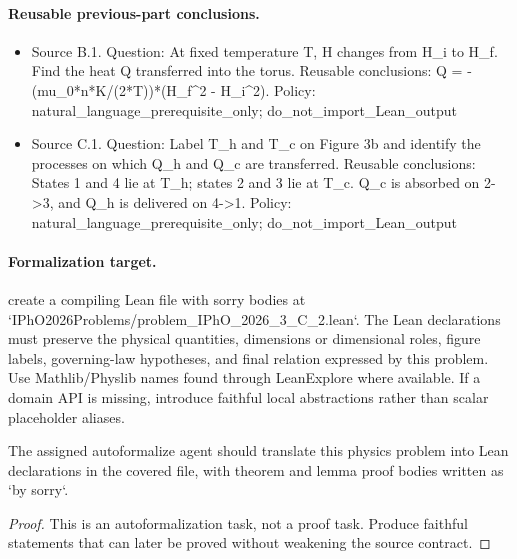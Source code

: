\paragraph{Reusable previous-part conclusions.}
\begin{itemize}
\item Source B.1. Question: At fixed temperature T, H changes from H\_i to H\_f. Find the heat Q transferred into the torus. Reusable conclusions: Q = -(mu\_0*n*K/(2*T))*(H\_f\textasciicircum{}2 - H\_i\textasciicircum{}2). Policy: natural\_language\_prerequisite\_only; do\_not\_import\_Lean\_output
\item Source C.1. Question: Label T\_h and T\_c on Figure 3b and identify the processes on which Q\_h and Q\_c are transferred. Reusable conclusions: States 1 and 4 lie at T\_h; states 2 and 3 lie at T\_c. Q\_c is absorbed on 2->3, and Q\_h is delivered on 4->1. Policy: natural\_language\_prerequisite\_only; do\_not\_import\_Lean\_output
\end{itemize}

\paragraph{Formalization target.}
create a compiling Lean file with sorry bodies at `IPhO2026Problems/problem\_IPhO\_2026\_3\_C\_2.lean`.
The Lean declarations must preserve the physical quantities, dimensions or dimensional roles, figure labels, governing-law hypotheses, and final relation expressed by this problem.
Use Mathlib/Physlib names found through LeanExplore where available. If a domain API is missing, introduce faithful local abstractions rather than scalar placeholder aliases.

\begin{theorem}
\label{thm:physics:IPhO_2026_3_C_2:target}
The assigned autoformalize agent should translate this physics problem into Lean declarations in the covered file, with theorem and lemma proof bodies written as `by sorry`.
\end{theorem}
\begin{proof}
This is an autoformalization task, not a proof task. Produce faithful statements that can later be proved without weakening the source contract.
\end{proof}

